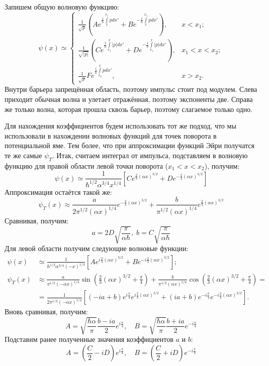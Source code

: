 Запишем общую волновую функцию:
\[
\psi(x) \simeq 
\begin{cases}
    \frac{1}{\sqrt{p}}\left( Ae^{\frac{i}{\hbar}\int\limits_x^{x_1} p dx'} + Be^{-\frac{i}{\hbar}\int\limits_x^{x_1} p dx'} \right), & x<x_1;\\
    \frac{1}{\sqrt{|p|}}\left( Ce^{\frac{1}{\hbar}\int\limits_{x_1}^{x} |p| dx'} + De^{-\frac{1}{\hbar}\int\limits_{x_1}^{x} |p| dx'} \right), & x_1< x < x_2;\\
    \frac{1}{\sqrt{p}}Fe^{\frac{i}{\hbar}\int\limits_{x_2}^{x} p dx'}, & x > x_2.
\end{cases}
\]
Внутри барьера запрещённая область, поэтому импульс стоит под модулем. Слева приходит обычная волна и улетает отражённая, поэтому экспоненты две. Справа же только волна, которая прошла сквозь барьер, поэтому слагаемое только одно. 

Для нахождения коэффициентов будем использовать тот же подход, что мы использовали в нахождении волновых функций для точек поворота в потенциальной яме. Тем более, что при аппроксимации функций Эйри получатся те же самые $\psi_T$. Итак, считаем интеграл от импульса, подставляем в волновую функцию для правой области левой точки поворота ($x_1 < x < x_2$), получим:
\[
    \psi(x) \simeq \frac{1}{\hbar^{1/2}\alpha^{3/4}x^{1/4}}\left[ Ce^{\frac{2}{3}(\alpha x)^{3/2}} + De^{-\frac{2}{3}(\alpha x)^{3/2}} \right]
\]
Аппроксимация остаётся такой же:
\[
    \psi_T(x) \approx \frac{a}{2\pi^{1/2}(\alpha x)^{1/4}}e^{-\frac{2}{3}(\alpha x)^{3/2}} + \frac{b}{\pi^{1/2}(\alpha x)^{1/4}}e^{\frac{2}{3}(\alpha x)^{3/2}}
\]
Сравнивая, получим:
\[
a = 2D\sqrt{\frac{\pi}{\alpha\hbar}},\; b = C\sqrt{\frac{\pi}{\alpha\hbar}}
\]
Для левой области получим следующие волновые функции:
\begin{align*}
    \psi(x) &\simeq \frac{1}{\hbar^{1/2}\alpha^{3/4}(-x)^{1/4}}\left[ Ae^{i\frac{2}{3}(\alpha x)^{3/2}} + Be^{-i\frac{2}{3}(\alpha x)^{3/2}} \right];\\
    \psi_T(x) &\approx \frac{a}{\pi^{1/2}(-\alpha x)^{1/4}}\sin\left(\frac{2}{3}(\alpha x)^{3/2} + \frac{\pi}{4}\right) + \frac{b}{\pi^{1/2}(\alpha x)^{1/4}}\cos\left(\frac{2}{3}(\alpha x)^{3/2} + \frac{\pi}{4}\right) = \\ 
    & = \frac{1}{2\pi^{1/2}(-\alpha x)^{1/4}}\left[ (-ia + b)e^{i\frac{\pi}{4}}e^{i\frac{2}{3}(\alpha x)^{3/2}} + (ia+b)e^{-i\frac{\pi}{4}}e^{-i\frac{2}{3}(\alpha x)^{3/2}} \right].
\end{align*}
Вновь сравнивая, получим:
\[
A = \sqrt{\frac{\hbar\alpha}{\pi}} \frac{b - ia}{2} e^{i\frac{\pi}{4}},\quad B = \sqrt{\frac{\hbar\alpha}{\pi}} \frac{b + ia}{2} e^{-i\frac{\pi}{4}}
\]
Подставим ранее полученные значения коэффициентов $a$ и $b$:
\[
    A = \left( \frac{C}{2} - iD \right)e^{i\frac{\pi}{4}}, \quad B = \left( \frac{C}{2} + iD \right)e^{-i\frac{\pi}{4}}
\]

